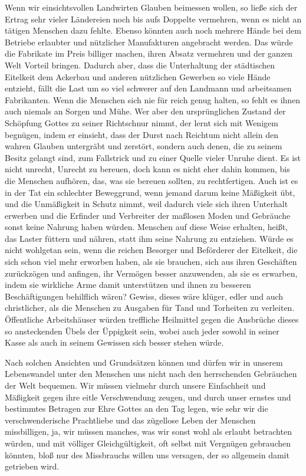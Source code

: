 Wenn wir einsichtsvollen
Landwirten Glauben beimessen wollen, so ließe sich der
Ertrag sehr vieler Ländereien noch bis aufs Doppelte vermehren, wenn es nicht an
tätigen Menschen dazu fehlte. Ebenso könnten auch noch mehrere Hände bei dem
Betriebe erlaubter und nützlicher Manufakturen angebracht werden. Das würde die
Fabrikate im Preis billiger machen, ihren Absatz vermehren und der ganzen Welt
Vorteil bringen. Dadurch aber, dass die Unterhaltung der städtischen Eitelkeit
dem Ackerbau und anderen nützlichen Gewerben so viele Hände entzieht, fällt die
Last um so viel schwerer auf den Landmann und arbeitsamen Fabrikanten. Wenn die
Menschen sich nie für reich genug halten, so fehlt es ihnen auch niemals an
Sorgen und Mühe. Wer aber den ursprünglichen Zustand der Schöpfung Gottes zu
seiner Richtschnur nimmt, der lernt sich mit Wenigem begnügen, indem er
einsieht, dass der Durst nach Reichtum nicht allein den wahren
Glauben
untergräbt und zerstört, sondern auch denen, die zu seinem Besitz gelangt
sind, zum Fallstrick und zu einer Quelle vieler Unruhe dient. Es ist nicht
unrecht, Unrecht zu bereuen, doch kann es nicht eher dahin kommen, bis die
Menschen aufhören, das, was sie bereuen sollten, zu rechtfertigen. Auch ist es
in der Tat ein schlechter Beweggrund, wenn jemand darum keine Mäßigkeit übt,
und die Unmäßigkeit in Schutz nimmt, weil dadurch viele sich ihren Unterhalt
erwerben und die Erfinder und Verbreiter der maßlosen Moden und Gebräuche sonst
keine Nahrung haben würden. Menschen auf diese Weise erhalten, heißt, das Laster
füttern und nähren, statt ihm seine Nahrung zu entziehen. Würde es nicht
wohlgetan sein, wenn die reichen Besorger und Beförderer der Eitelkeit, die
sich schon viel mehr erworben haben, als sie brauchen, sich aus ihren
Geschäften
zurückzögen und anfingen, ihr Vermögen besser anzuwenden, als sie es erwarben,
indem sie wirkliche Arme damit unterstützen und ihnen zu besseren
Beschäftigungen
behilflich wären? Gewiss, dieses wäre klüger, edler und auch christlicher, als
die
Menschen zu Ausgaben für Tand und Torheiten zu verleiten. Öffentliche
Arbeitshäuser würden treffliche Heilmittel gegen die
Ausbrüche dieses so
ansteckenden Übels der Üppigkeit sein, wobei auch jeder sowohl in seiner Kasse
als auch in seinem Gewissen sich besser stehen würde.

\medskip

Nach solchen Ansichten und Grundsätzen können und dürfen wir in unserem
Lebenswandel unter den Menschen uns nicht nach den herrschenden Gebräuchen der
Welt bequemen. Wir müssen vielmehr durch unsere Einfachheit und Mäßigkeit gegen
ihre eitle Verschwendung zeugen, und durch unser ernstes und
bestimmtes Betragen
zur Ehre Gottes an den Tag legen, wie sehr wir die verschwenderische Prachtliebe
und das zügellose Leben der Menschen missbilligen, ja, wir müssen manches, was
wir sonst wohl als erlaubt betrachten würden, und mit völliger Gleichgültigkeit,
oft selbst mit Vergnügen gebrauchen könnten, bloß nur des Missbrauchs willen uns
versagen, der so allgemein damit getrieben wird.

